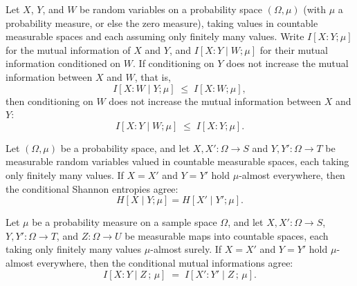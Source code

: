 \begin{theorem}
\label{ProbabilityTheory.condMutualInfo_le_mutualInfo_of_condDependence_le}
\leanok
{}
Let $X$, $Y$, and $W$ be random variables on a probability space $(\Omega,\mu)$ (with
$\mu$ a probability measure, or else the zero measure), taking values in countable
measurable spaces and each assuming only finitely many values. Write $I[X : Y;\mu]$ for
the mutual information of $X$ and $Y$, and $I[X : Y \mid W;\mu]$ for their mutual
information conditioned on $W$. If conditioning on $Y$ does not increase the mutual
information between $X$ and $W$, that is,
\[
  I[X : W \mid Y;\mu] \;\le\; I[X : W;\mu],
\]
then conditioning on $W$ does not increase the mutual information between $X$ and $Y$:
\[
  I[X : Y \mid W;\mu] \;\le\; I[X : Y;\mu].
\]
\end{theorem}

\begin{theorem}
\label{ProbabilityTheory.condEntropy_congr_ae}
\leanok
{}
Let $(\Omega,\mu)$ be a probability space, and let $X,X'\colon\Omega\to S$ and
$Y,Y'\colon\Omega\to T$ be measurable random variables valued in countable measurable
spaces, each taking only finitely many values. If $X = X'$ and $Y = Y'$ hold
$\mu$-almost everywhere, then the conditional Shannon entropies agree: \[ H[X \mid
Y;\mu] = H[X' \mid Y';\mu]. \]
\end{theorem}

\begin{theorem}
\label{ProbabilityTheory.condMutualInfo_congr_ae_left_right}
\leanok
{}
Let $\mu$ be a probability measure on a sample space $\Omega$, and let $X, X' \colon
\Omega \to S$, $Y, Y' \colon \Omega \to T$, and $Z \colon \Omega \to U$ be measurable
maps into countable spaces, each taking only finitely many values $\mu$-almost surely.
If $X = X'$ and $Y = Y'$ hold $\mu$-almost everywhere, then the conditional mutual
informations agree:
\[
I[X : Y \mid Z\,;\,\mu] \;=\; I[X' : Y' \mid Z\,;\,\mu].
\]
\end{theorem}

